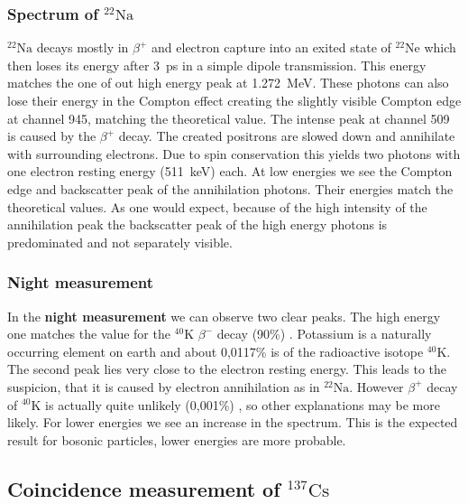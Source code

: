 \subsubsection{Spectrum of $^{22}\text{Na}$}
%
\textbf{$^{22}\text{Na}$} decays mostly in $\beta^{+}$ and electron capture into an exited state of $^{22}\text{Ne}$ which then loses its energy after \SI{3}{\pico\second} in a simple dipole transmission.
This energy matches the one of out high energy peak at \SI{1.272}{\mega\electronvolt}.
These photons can also lose their energy in the Compton effect creating the slightly visible Compton edge at channel 945, matching the theoretical value.
The intense peak at channel 509 is caused by the $\beta^{+}$ decay.
The created positrons are slowed down and annihilate with surrounding electrons.
Due to spin conservation this yields two photons with one electron resting energy (\SI{511}{\kilo\electronvolt}) each.
At low energies we see the Compton edge and backscatter peak of the annihilation photons.
Their energies match the theoretical values.
As one would expect, because of the high intensity of the annihilation peak the backscatter peak of the high energy photons is predominated and not separately visible.
%
\subsubsection{Night measurement}
%
In the \textbf{night measurement} we can observe two clear peaks.
The high energy one matches the value for the $^{40}\text{K}$ $\beta^{-}$ decay (90\%) \cite{WikiPotassium}.
Potassium is a naturally occurring element on earth and about 0,0117\% is of the radioactive isotope $^{40}\text{K}$.
The second peak lies very close to the electron resting energy.
This leads to the suspicion, that it is caused by electron annihilation as in $^{22}\text{Na}$.
However $\beta^{+}$ decay of $^{40}\text{K}$ is actually quite unlikely (0,001\%) \cite{WikiPotassium}, so other explanations may be more likely.
For lower energies we see an increase in the spectrum.
This is the expected result for bosonic particles, lower energies are more probable.
%
\subsection{Coincidence measurement of $^{137}\text{Cs}$}
%
